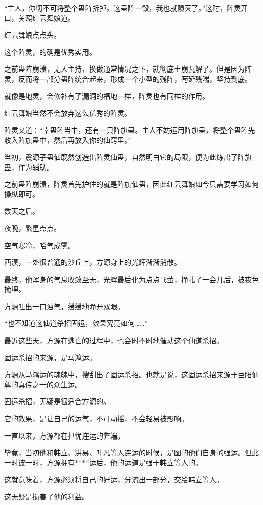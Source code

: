 
\begin{this_body}

“主人，你切不可将整个蛊阵拆掉。这蛊阵一毁，我也就陨灭了。”这时，阵灵开口，关照红云舞娘道。

红云舞娘点点头。

这个阵灵，的确是优秀实用。

之前蛊阵崩溃，无人主持，换做通常情况之下，就彻底土崩瓦解了。但是因为阵灵，反而将一部分蛊阵统合起来，形成一个小型的残阵，苟延残喘，坚持到底。

就像是地灵，会修补有了漏洞的福地一样，阵灵也有同样的作用。

红云舞娘当然不会放弃这么优秀的阵灵。

阵灵又道：“幸蛊阵当中，还有一只阵旗蛊。主人不妨运用阵旗蛊，将整个蛊阵先收入阵旗蛊中，然后再放入你的仙窍里。”

当初，震源子蛊仙既然创造出阵灵仙蛊，自然明白它的局限，便为此炼出了阵旗蛊，作为辅助。

之前蛊阵崩溃，阵灵首先护住的就是阵旗仙蛊，因此红云舞娘如今只需要学习如何操纵即可。

数天之后。

夜晚，繁星点点。

空气寒冷，哈气成雾。

西漠，一处很普通的沙丘上，方源身上的光辉渐渐消散。

最终，他浑身的气息收敛至无，光辉最后化为点点飞萤，挣扎了一会儿后，被夜色掩埋。

方源吐出一口浊气，缓缓地睁开双眼。

“也不知道这仙道杀招固运，效果究竟如何……”

最近这些天，方源在逃亡的过程中，也会时不时地催动这个仙道杀招。

固运杀招的来源，是马鸿运。

方源从马鸿运的魂魄中，搜刮出了固运杀招。也就是说，这固运杀招来源于巨阳仙尊的真传之一的众生运。

固运杀招，无疑是很适合方源的。

它的效果，是让自己的运气，不可动摇，不会轻易被影响。

一直以来，方源都在担忧连运的弊端。

毕竟，当初他和韩立、洪易、叶凡等人连运的时候，是图的他们自身的强运。但此一时彼一时，方源拥有****运后，他的运道是强于韩立等人的。

这就意味着，方源必须将自己的好运，分流出一部分，交给韩立等人。

这无疑是损害了他的利益。


\end{this_body}
